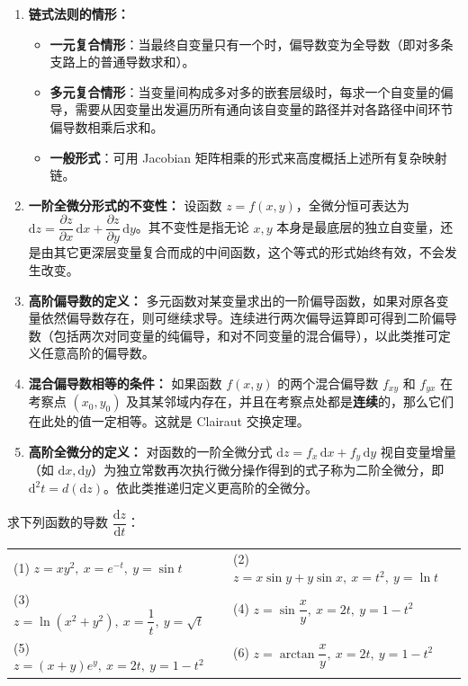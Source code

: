 \documentclass[lang=cn,11pt]{elegantbook}
\begin{document}
\begin{solution}
\begin{enumerate}
  \item[(1)] \textbf{链式法则的情形：}
  \begin{itemize}
    \item \textbf{一元复合情形}：当最终自变量只有一个时，偏导数变为全导数（即对多条支路上的普通导数求和）。
    \item \textbf{多元复合情形}：当变量间构成多对多的嵌套层级时，每求一个自变量的偏导，需要从因变量出发遍历所有通向该自变量的路径并对各路径中间环节偏导数相乘后求和。
    \item \textbf{一般形式}：可用 Jacobian 矩阵相乘的形式来高度概括上述所有复杂映射链。
  \end{itemize}

  \item[(2)] \textbf{一阶全微分形式的不变性：}
  设函数 $z = f(x, y)$，全微分恒可表达为 $\mathrm{d}z = \dfrac{\partial z}{\partial x}\,\mathrm{d}x + \dfrac{\partial z}{\partial y}\,\mathrm{d}y$。其不变性是指无论 $x, y$ 本身是最底层的独立自变量，还是由其它更深层变量复合而成的中间函数，这个等式的形式始终有效，不会发生改变。

  \item[(3)] \textbf{高阶偏导数的定义：}
  多元函数对某变量求出的一阶偏导函数，如果对原各变量依然偏导数存在，则可继续求导。连续进行两次偏导运算即可得到二阶偏导数（包括两次对同变量的纯偏导，和对不同变量的混合偏导），以此类推可定义任意高阶的偏导数。

  \item[(4)] \textbf{混合偏导数相等的条件：}
  如果函数 $f(x,y)$ 的两个混合偏导数 $f_{xy}$ 和 $f_{yx}$ 在考察点 $(x_0, y_0)$ 及其某邻域内存在，并且在考察点处都是\textbf{连续}的，那么它们在此处的值一定相等。这就是 Clairaut 交换定理。

  \item[(5)] \textbf{高阶全微分的定义：}
  对函数的一阶全微分式 $\mathrm{d}z = f_x\,\mathrm{d}x + f_y\,\mathrm{d}y$ 视自变量增量（如 $\mathrm{d}x, \mathrm{d}y$）为独立常数再次执行微分操作得到的式子称为二阶全微分，即 $\mathrm{d}^2t = d(\mathrm{d}z)$。依此类推递归定义更高阶的全微分。
\end{enumerate}
\end{solution}

\begin{exercise}[链式法则求一阶导数]
求下列函数的导数 $\dfrac{\mathrm{d}z}{\mathrm{d}t}$：\\
\begin{tabular}{p{} p{}}
(1) $z = xy^2,\ x = e^{-t},\ y = \sin t$ & (2) $z = x\sin y + y\sin x,\ x = t^2,\ y = \ln t$ \\
(3) $z = \ln(x^2+y^2),\ x = \dfrac{1}{t},\ y = \sqrt{t}$ & (4) $z = \sin\dfrac{x}{y},\ x = 2t,\ y = 1-t^2$ \\
(5) $z = (x+y)e^y,\ x = 2t,\ y = 1-t^2$ & (6) $z = \arctan\dfrac{x}{y},\ x = 2t,\ y = 1-t^2$
\end{tabular}
\end{exercise}
\end{document}
